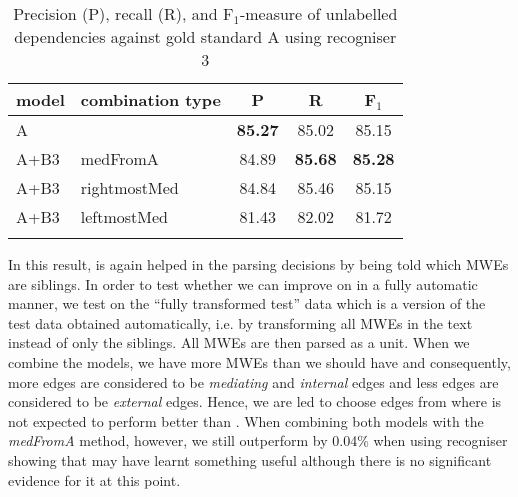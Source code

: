 \documentclass[output=paper]{langsci/langscibook}
\begin{document}
\begin{table}[h]
    \centering
    \begin{tabular}{l l c c c} %
      \lsptoprule
        \textnormal{model}
        & \textnormal{combination type}
        & \textnormal{P}
        & \textnormal{R}
        & \textnormal{F$_1$}
        \\ %
        \midrule
        A & & \textbf{85.27} & 85.02 & 85.15\\
        A+B3 & medFromA &84.89  &\textbf{85.68} & \textbf{85.28} \\
        A+B3 & rightmostMed &84.84  &85.46  & 85.15 \\
        A+B3 & leftmostMed &81.43  &82.02  & 81.72 \tabularnewline %
        \lspbottomrule
    \end{tabular}
    \caption{Precision (P), recall (R), and F$_1$-measure of unlabelled dependencies against gold standard A using recogniser 3\label{del:tab:res2}}
\end{table}

\indent In this result, {\modelB} is again helped in the parsing decisions by being told which MWEs are siblings. In order to test whether we can improve on {\modelA} in a fully automatic manner, we test {\modelB} on the ``fully transformed test'' data which is a version of the test data obtained automatically, i.e. by transforming all MWEs in the text instead of only the siblings. All MWEs are then parsed as a unit. When we combine the models, we have more MWEs than we should have and consequently, more edges are considered to be \textit{mediating} and \textit{internal} edges and less edges are considered to be \textit{external} edges. Hence, we are led to choose edges from {\modelA} where {\modelA} is not expected to perform better than {\modelB}. When combining both models with the \textit{medFromA} method, however, we still outperform {\modelA} by 0.04\% when using recogniser showing that {\modelB} may have learnt something useful although there is no significant evidence for it at this point. 
\end{document}
